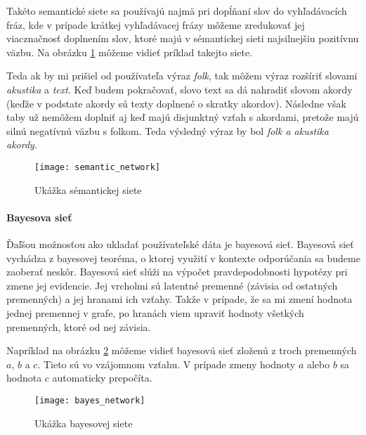 Takéto semantické siete sa používajú najmä pri dopĺňaní slov do vyhľadávacích fráz,
kde v prípade krátkej vyhľadávacej frázy môžeme zredukovať jej viacznačnosť doplnením
slov, ktoré majú v sémantickej sieti najsilnejšiu pozitívnu väzbu.
Na obrázku \ref{fig:semantic_network} môžeme vidieť príklad takejto siete.

Teda ak by mi prišiel od používateľa výraz \textit{folk}, tak môžem výraz rozšíriť slovami
\textit{akustika} a \textit{text}. Keď budem pokračovať, slovo text sa dá nahradiť slovom
akordy (keďže v podstate akordy sú texty doplnené o skratky akordov). Následne však taby už
nemôžem doplniť aj keď majú disjunktný vzťah s akordami, pretože majú silnú negatívnú 
väzbu s folkom. Teda výsledný výraz by bol \textit{folk a akustika akordy}.

\begin{figure}
    \begin{center}
        \texttt{[image: semantic\_network]}
        \caption{Ukážka sémantickej siete}
        \label{fig:semantic_network}
    \end{center}
\end{figure}

\paragraph{Bayesova sieť}

Ďaľšou možnosťou ako ukladať používateľské dáta je bayesová sieť. Bayesová sieť vychádza z 
bayesovej teoréma, o ktorej využití v kontexte odporúčania sa budeme zaoberať neskôr.
Bayesová sieť slúži na výpočet pravdepodobnosti hypotézy pri zmene jej evidencie.
Jej vrcholmi sú latentné premenné (závisia od ostatných premenných) a jej hranami ich vzťahy.
Takže v prípade, že sa mi zmení hodnota jednej premennej v grafe, po hranách viem upraviť hodnoty 
všetkých premenných, ktoré od nej závisia.

Napríklad na obrázku \ref{fig:bayes_network} môžeme vidieť bayesovú sieť zloženú z troch 
premenných \(a\), \(b\) a \(c\). Tieto sú vo vzájomnom vzťahu. V prípade zmeny hodnoty \(a\)
alebo \(b\) sa hodnota \(c\) automaticky prepočíta.

\begin{figure}
    \begin{center}
        \texttt{[image: bayes\_network]}
        \caption{Ukážka bayesovej siete}
        \label{fig:bayes_network}
    \end{center}
\end{figure}

